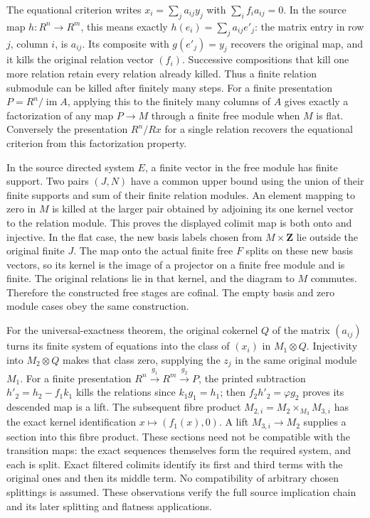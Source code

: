 The equational criterion writes \(x_i=\sum_j a_{ij}y_j\) with \(\sum_i f_i a_{ij}=0\). In the source map \(h:R^n\to R^m\), this means exactly \(h(e_i)=\sum_j a_{ij}e'_j\): the matrix entry in row \(j\), column \(i\), is \(a_{ij}\). Its composite with \(g(e'_j)=y_j\) recovers the original map, and it kills the original relation vector \((f_i)\). Successive compositions that kill one more relation retain every relation already killed. Thus a finite relation submodule can be killed after finitely many steps. For a finite presentation \(P=R^n/\operatorname{im}A\), applying this to the finitely many columns of \(A\) gives exactly a factorization of any map \(P\to M\) through a finite free module when \(M\) is flat. Conversely the presentation \(R^n/Rx\) for a single relation recovers the equational criterion from this factorization property.

In the source directed system \(E\), a finite vector in the free module has finite support. Two pairs \((J,N)\) have a common upper bound using the union of their finite supports and sum of their finite relation modules. An element mapping to zero in \(M\) is killed at the larger pair obtained by adjoining its one kernel vector to the relation module. This proves the displayed colimit map is both onto and injective. In the flat case, the new basis labels chosen from \(M\times\mathbf Z\) lie outside the original finite \(J\). The map onto the actual finite free \(F\) splits on these new basis vectors, so its kernel is the image of a projector on a finite free module and is finite. The original relations lie in that kernel, and the diagram to \(M\) commutes. Therefore the constructed free stages are cofinal. The empty basis and zero module cases obey the same construction.

For the universal-exactness theorem, the original cokernel \(Q\) of the matrix \((a_{ij})\) turns its finite system of equations into the class of \((x_i)\) in \(M_1\otimes Q\). Injectivity into \(M_2\otimes Q\) makes that class zero, supplying the \(z_j\) in the same original module \(M_1\). For a finite presentation \(R^n\xrightarrow{g_1}R^m\xrightarrow{g_2}P\), the printed subtraction \(h'_2=h_2-f_1k_1\) kills the relations since \(k_1g_1=h_1\); then \(f_2h'_2=\varphi g_2\) proves its descended map is a lift. The subsequent fibre product \(M_{2,i}=M_2\times_{M_3}M_{3,i}\) has the exact kernel identification \(x\mapsto(f_1(x),0)\). A lift \(M_{3,i}\to M_2\) supplies a section into this fibre product. These sections need not be compatible with the transition maps: the exact sequences themselves form the required system, and each is split. Exact filtered colimits identify its first and third terms with the original ones and then its middle term. No compatibility of arbitrary chosen splittings is assumed. These observations verify the full source implication chain and its later splitting and flatness applications.

